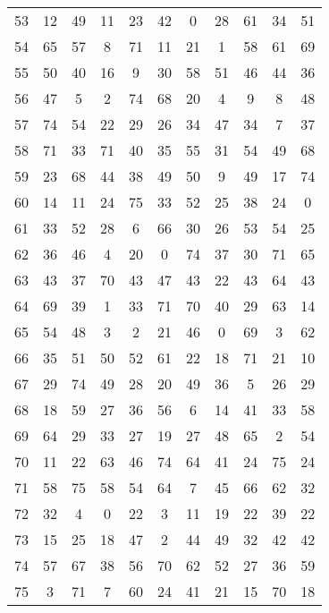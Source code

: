 \begin{table}
\begin{tabular}{c c c c c c c c c c c }
53 & 12 & 49 & 11 & 23 & 42 & 0 & 28 & 61 & 34 & 51 \\
54 & 65 & 57 & 8 & 71 & 11 & 21 & 1 & 58 & 61 & 69 \\
55 & 50 & 40 & 16 & 9 & 30 & 58 & 51 & 46 & 44 & 36 \\
56 & 47 & 5 & 2 & 74 & 68 & 20 & 4 & 9 & 8 & 48 \\
57 & 74 & 54 & 22 & 29 & 26 & 34 & 47 & 34 & 7 & 37 \\
58 & 71 & 33 & 71 & 40 & 35 & 55 & 31 & 54 & 49 & 68 \\
59 & 23 & 68 & 44 & 38 & 49 & 50 & 9 & 49 & 17 & 74 \\
60 & 14 & 11 & 24 & 75 & 33 & 52 & 25 & 38 & 24 & 0 \\
61 & 33 & 52 & 28 & 6 & 66 & 30 & 26 & 53 & 54 & 25 \\
62 & 36 & 46 & 4 & 20 & 0 & 74 & 37 & 30 & 71 & 65 \\
63 & 43 & 37 & 70 & 43 & 47 & 43 & 22 & 43 & 64 & 43 \\
64 & 69 & 39 & 1 & 33 & 71 & 70 & 40 & 29 & 63 & 14 \\
65 & 54 & 48 & 3 & 2 & 21 & 46 & 0 & 69 & 3 & 62 \\
66 & 35 & 51 & 50 & 52 & 61 & 22 & 18 & 71 & 21 & 10 \\
67 & 29 & 74 & 49 & 28 & 20 & 49 & 36 & 5 & 26 & 29 \\
68 & 18 & 59 & 27 & 36 & 56 & 6 & 14 & 41 & 33 & 58 \\
69 & 64 & 29 & 33 & 27 & 19 & 27 & 48 & 65 & 2 & 54 \\
70 & 11 & 22 & 63 & 46 & 74 & 64 & 41 & 24 & 75 & 24 \\
71 & 58 & 75 & 58 & 54 & 64 & 7 & 45 & 66 & 62 & 32 \\
72 & 32 & 4 & 0 & 22 & 3 & 11 & 19 & 22 & 39 & 22 \\
73 & 15 & 25 & 18 & 47 & 2 & 44 & 49 & 32 & 42 & 42 \\
74 & 57 & 67 & 38 & 56 & 70 & 62 & 52 & 27 & 36 & 59 \\
75 & 3 & 71 & 7 & 60 & 24 & 41 & 21 & 15 & 70 & 18 \\
\hline
\end{tabular}
\end{table}